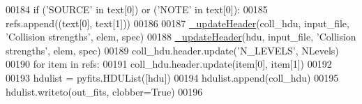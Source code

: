 \begin{DoxyCode}
00184             \textcolor{keywordflow}{if} (\textcolor{stringliteral}{'SOURCE'} \textcolor{keywordflow}{in} text[0]) \textcolor{keywordflow}{or} (\textcolor{stringliteral}{'NOTE'} \textcolor{keywordflow}{in} text[0]):
00185                 refs.append((text[0], text[1]))
00186 
00187     \hyperlink{namespacepyneb_1_1utils_1_1fits_a40031d2d7de219b95d7475243b3888eb}{\_updateHeader}(coll\_hdu, input\_file, \textcolor{stringliteral}{'Collision strengths'}, elem, spec)
00188     \hyperlink{namespacepyneb_1_1utils_1_1fits_a40031d2d7de219b95d7475243b3888eb}{\_updateHeader}(hdu, input\_file, \textcolor{stringliteral}{'Collision strengths'}, elem, spec)
00189     coll\_hdu.header.update(\textcolor{stringliteral}{'N\_LEVELS'}, NLevels)
00190     \textcolor{keywordflow}{for} item \textcolor{keywordflow}{in} refs:
00191         coll\_hdu.header.update(item[0], item[1])
00192 
00193     hdulist = pyfits.HDUList([hdu])
00194     hdulist.append(coll\_hdu)
00195     hdulist.writeto(out\_fits, clobber=\textcolor{keyword}{True})
00196 

\end{DoxyCode}
